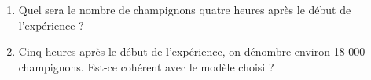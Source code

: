 \begin{center}
\begin{minipage}{0.75\textwidth}
\begin{enumerate}[start=3]
\item Quel sera le nombre de champignons quatre heures après le début de l'expérience ?

\item Cinq heures après le début de l'expérience, on dénombre environ 18 000 champignons. Est-ce cohérent avec le modèle choisi ?
\end{enumerate}
\end{minipage}
\hfill
{}
\end{center}

